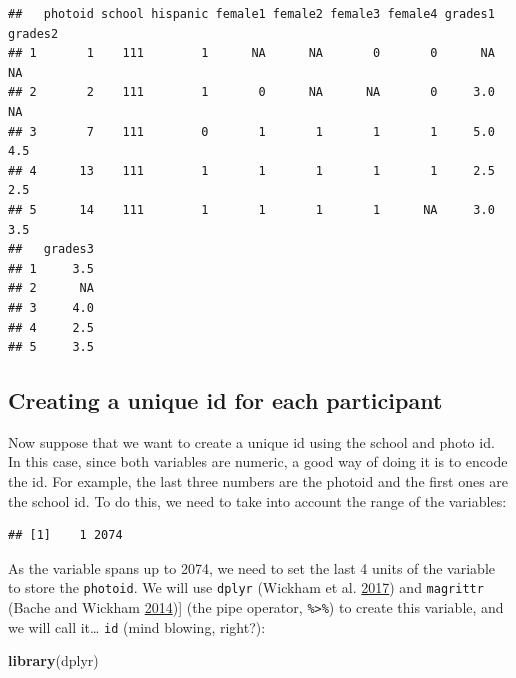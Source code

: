 \documentclass[]{book}
\newenvironment{Shaded}{\begin{snugshade}}{\end{snugshade}}
\newcommand{\KeywordTok}[1]{\textcolor[rgb]{0.13,0.29,0.53}{\textbf{#1}}}
\newcommand{\NormalTok}[1]{#1}
\newcommand{\OperatorTok}[1]{\textcolor[rgb]{0.81,0.36,0.00}{\textbf{#1}}}
\newcommand{\StringTok}[1]{\textcolor[rgb]{0.31,0.60,0.02}{#1}}
\begin{document}
\begin{verbatim}
##   photoid school hispanic female1 female2 female3 female4 grades1 grades2
## 1       1    111        1      NA      NA       0       0      NA      NA
## 2       2    111        1       0      NA      NA       0     3.0      NA
## 3       7    111        0       1       1       1       1     5.0     4.5
## 4      13    111        1       1       1       1       1     2.5     2.5
## 5      14    111        1       1       1       1      NA     3.0     3.5
##   grades3
## 1     3.5
## 2      NA
## 3     4.0
## 4     2.5
## 5     3.5
\end{verbatim}

\hypertarget{creating-a-unique-id-for-each-participant}{%
\subsection{Creating a unique id for each participant}\label{creating-a-unique-id-for-each-participant}}

Now suppose that we want to create a unique id using the school and photo id. In this case, since both variables are numeric, a good way of doing it is to encode the id. For example, the last three numbers are the photoid and the first ones are the school id. To do this, we need to take into account the range of the variables:

\begin{Shaded}
\end{Shaded}

\begin{verbatim}
## [1]    1 2074
\end{verbatim}

As the variable spans up to 2074, we need to set the last 4 units of the variable to store the \texttt{photoid}. We will use \texttt{dplyr} (Wickham et al. \protect\hyperlink{ref-R-dplyr}{2017}) and \texttt{magrittr} (Bache and Wickham \protect\hyperlink{ref-R-magrittr}{2014}){]} (the pipe operator, \texttt{\%\textgreater{}\%}) to create this variable, and we will call it\ldots{} \texttt{id} (mind blowing, right?):

\begin{Shaded}
\begin{Highlighting}[]
\KeywordTok{library}\NormalTok{(dplyr)}
\end{Highlighting}
\end{Shaded}
\end{document}
